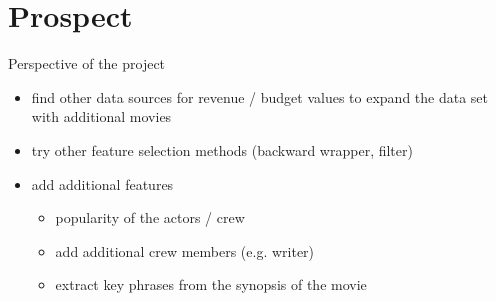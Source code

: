 \chapter{Prospect}
Perspective of the project
\label{cha:prospect}
\begin{itemize}
	\item find other data sources for revenue / budget values to expand the data set with additional movies
	\item try other feature selection methods (backward wrapper, filter)
	\item add additional features
	\begin{itemize}
		\item popularity of the actors / crew
		\item add additional crew members (e.g. writer)
		\item extract key phrases from the synopsis of the movie
	\end{itemize}
\end{itemize}